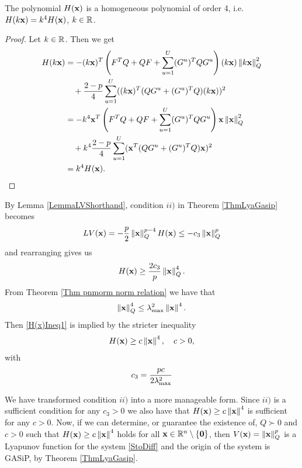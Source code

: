 \documentclass[a4paper,12pt,twoside,BCOR=10mm]{scrbook}
\begin{document}
\begin{lemma}\label{LemmaH(x)Homogeneous}
The polynomial $H(\mathbf{x})$ is a homogeneous polynomial of order 4, i.e. $H(k\mathbf{x}) = k^4H(\mathbf{x})$, $k\in\mathbb{R}^{}$.
\end{lemma}
\begin{proof}
Let $k\in\mathbb{R}^{}$. Then we get
\begin{align*}
\begin{split}
    H(k\mathbf{x}) &= -(k\mathbf{x})^T\left(F^TQ + QF + \sum_{u=1}^U(G^u)^TQG^u\right)(k\mathbf{x})\left\lVert k\mathbf{x}\right\rVert_{Q}^{2}\\
    &\quad + \frac{2 - p}{4}\sum_{u=1}^U((k\mathbf{x})^T (QG^u + (G^u)^TQ)(k\mathbf{x}))^2\\
    &= -k^4\mathbf{x}^T\left(F^TQ + QF +\sum_{u = 1}^U (G^u)^T Q G^u\right)\mathbf{x}\left\lVert\mathbf{x}\right\rVert_{Q}^{2}\\
    &\quad + k^4 \frac{2 - p}{4}\sum_{u=1}^U(\mathbf{x}^T(QG^u + (G^u)^TQ)\mathbf{x})^2\\
    &= k^4H(\mathbf{x}).
\end{split}
\end{align*}
\end{proof}
By Lemma \ref{LemmaLVShorthand}, condition $ii)$ in Theorem \ref{ThmLyaGasip} becomes
\begin{align*}
    LV(\mathbf{x}) = -\frac{p}{2}\left\lVert\mathbf{x}\right\rVert_{Q}^{p - 4}H(\mathbf{x}) \leq -c_3\left\lVert\mathbf{x}\right\rVert_Q^p
\end{align*}
and rearranging gives us
\begin{align}\label{H(x)Ineq1}
    H(\mathbf{x}) \geq \frac{2c_3}{p}\left\lVert\mathbf{x}\right\rVert_{Q}^{4}.
\end{align}
From Theorem \ref{Thm pnmorm norm relation} we have that
\begin{align*}
    \left\lVert\mathbf{x}\right\rVert_{Q}^{4} \leq \lambda_{\max}^2 \left\lVert\mathbf{x}\right\rVert^4.
\end{align*}
Then \eqref{H(x)Ineq1} is implied by the stricter inequality
\begin{align}\label{H(x)Ineq3}
    H(\mathbf{x}) \geq c\left\lVert\mathbf{x}\right\rVert_{}^{4}, \quad c > 0,
\end{align}
with
\begin{align*}
    c_3 = \frac{pc}{2 \lambda_{\max}^2}
\end{align*}

We have transformed condition $ii)$ into a more manageable form. Since $ii)$ is a sufficient condition for any $c_3 > 0$ we also have that $H(\mathbf{x}) \geq c\left\lVert\mathbf{x}\right\rVert_{}^{4}$ is sufficient for any $c > 0$. Now, if we can determine, or guarantee the existence of, $Q \succ 0$ and $c > 0$ such that $H(\mathbf{x}) \geq c\left\lVert\mathbf{x}\right\rVert_{}^{4}$ holds for all $\mathbf{x} \in \mathbb{R}^{n}\setminus \{\mathbf{0}\}$, then $V(\mathbf{x}) = \left\lVert\mathbf{x}\right\rVert_{Q}^{p}$ is a Lyapunov function for the system \eqref{StoDiff} and the origin of the system is GASiP, by Theorem \ref{ThmLyaGasip}.
\end{document}

